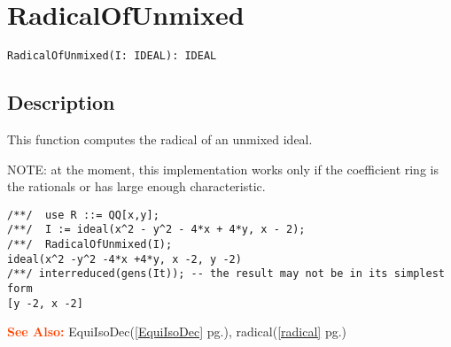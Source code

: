 \documentclass[a4paper]{mybook}
\newenvironment{command}{}{} %
\newcommand\SeeAlso{\par\textcolor{OrangeRed}{\textbf{\large See Also: }}}
\begin{document}
\section{RadicalOfUnmixed}
\label{RadicalOfUnmixed}
\begin{command} %


\begin{Verbatim}[label=syntax, rulecolor=\color{MidnightBlue},
frame=single]
RadicalOfUnmixed(I: IDEAL): IDEAL
\end{Verbatim}


\subsection*{Description}

This function computes the radical of an unmixed ideal.
\par 
NOTE: at the moment, this implementation works only if the coefficient
ring is the rationals or has large enough characteristic.
\begin{Verbatim}[label=example, rulecolor=\color{PineGreen}, frame=single]
/**/  use R ::= QQ[x,y];
/**/  I := ideal(x^2 - y^2 - 4*x + 4*y, x - 2);
/**/  RadicalOfUnmixed(I);
ideal(x^2 -y^2 -4*x +4*y, x -2, y -2)
/**/ interreduced(gens(It)); -- the result may not be in its simplest form
[y -2, x -2]
\end{Verbatim}


\SeeAlso %
  EquiIsoDec(\ref{EquiIsoDec} pg.\pageref{EquiIsoDec}), 
    radical(\ref{radical} pg.\pageref{radical})
\end{command} %
\end{document}
